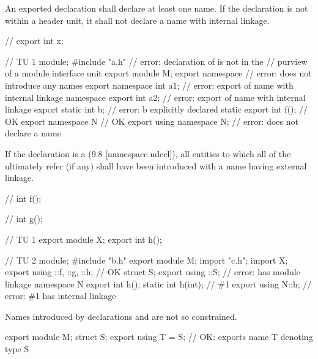 \begin{std.txt}
  \pnum
  An exported declaration shall declare at least one name.
  If the declaration is not within a header unit,
  it shall not declare a name with internal linkage.

  \pnum
  \begin{example}
    \begin{codeblock}
      // 
      export int x;

      // TU 1
      module;
      #include "a.h"            // error: declaration of  is not in the
                                // purview of a module interface unit
      export module M;
      export namespace {}       // error: does not introduce any names
      export namespace {
        int a1;                 // error: export of name with internal linkage
      }
      namespace {
        export int a2;          // error: export of name with internal linkage
      }
      export static int b;      // error: b explicitly declared static
      export int f();           // OK
      export namespace N { }    // OK
      export using namespace N; // error: does not declare a name
    \end{codeblock}
  \end{example}

  \pnum
  If the declaration is a 
  (9.8 [namespace.udecl]), all entities to which all of the
   ultimately refer (if any)
  shall have been introduced with a name having external linkage.
\begin{example}
\begin{codeblock}
// 
int f();

// 
int g();

// TU 1
export module X;
export int h();

// TU 2
module;
#include "b.h"
export module M;
import "c.h";
import X;
export using ::f, ::g, ::h;     // OK
struct S;
export using ::S;               // error:  has module linkage
namespace N {
  export int h();
  static int h(int);            // \#1
}
export using N::h;              // error: \#1 has internal linkage
\end{codeblock}
\end{example}
  \enternote
  Names introduced by  declarations
  and 
  are not so constrained.
  \begin{example}
    \begin{codeblock}
      export module M;
      struct S;
      export using T = S;   // OK: exports name T denoting type S
    \end{codeblock}
  \end{example}
  \exitnote


\end{std.txt}
